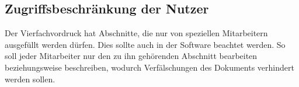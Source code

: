 \subsection{Zugriffsbeschränkung der Nutzer}
Der Vierfachvordruck hat Abschnitte, die nur von speziellen Mitarbeitern ausgefüllt werden dürfen. Dies sollte auch in der Software beachtet werden. So soll jeder Mitarbeiter nur den zu ihn gehörenden Abschnitt bearbeiten beziehungsweise beschreiben, wodurch Verfälschungen des Dokuments verhindert werden sollen.